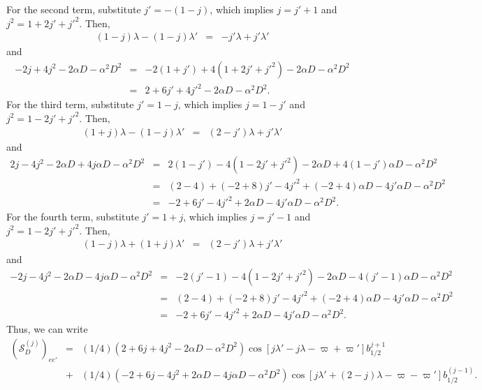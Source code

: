 \documentclass [12pt, a4paper] {article}
\begin{document}
For the second term, substitute $j'= -(1-j)$, which implies 
$j = j' + 1$ and $j^2 = 1 + 2j' + j'^2$. Then,
\begin {eqnarray}
    (1 - j)\lambda - (1- j)\lambda' 
    &=& 
    - j'\lambda + j'\lambda'
\end {eqnarray}
and 
\begin {eqnarray}
    -2j + 4j^2 - 2\alpha D - \alpha^2D^2 
    &=&
    -2(1 + j') + 4(1 + 2j' + j'^2) - 2\alpha D - \alpha^2D^2
    \\
    &=& 
    2 + 6j' + 4j'^2 - 2\alpha D - \alpha^2D^2.
\end {eqnarray}
For the third term, substitute $j'= 1-j$, which implies 
$j = 1 - j'$ and $j^2 = 1 - 2j' + j'^2$. Then,
\begin {eqnarray}
    (1 + j)\lambda - (1- j)\lambda' 
    &=& 
    (2 - j')\lambda + j'\lambda'
\end {eqnarray}
and 
\begin {eqnarray}
    2j - 4j^2 - 2\alpha D + 4j\alpha D - \alpha^2D^2 
    &=&
    2(1 - j') - 4(1 - 2j' + j'^2) - 2\alpha D  + 4(1 - j')\alpha D - \alpha^2D^2
    \\
    &=& 
    (2 - 4) + (-2 + 8)j' -4j'^2  + (-2 + 4)\alpha D - 4j'\alpha D - \alpha^2D^2
    \quad\quad
    \\
    &=&
    -2 + 6j' - 4j'^2 + 2\alpha D - 4j'\alpha D - \alpha^2D^2.
\end {eqnarray}
For the fourth term, substitute $j'= 1+j$, which implies 
$j = j' - 1$ and $j^2 = 1 - 2j' + j'^2$. Then,
\begin {eqnarray}
    (1 - j)\lambda + (1 + j)\lambda' 
    &=& 
    (2 - j')\lambda + j'\lambda'
\end {eqnarray}
and 
\begin {eqnarray}
    -2j - 4j^2 - 2\alpha D - 4j\alpha D - \alpha^2D^2 
    &=&
    -2(j' - 1) - 4(1 - 2j' + j'^2) - 2\alpha D  - 4(j' - 1)\alpha D - \alpha^2D^2
    \\
    &=& 
    (2 - 4) + (-2 + 8)j' -4j'^2  + (-2 + 4)\alpha D - 4j'\alpha D - \alpha^2D^2
    \quad\quad
    \\
    &=&
    -2 + 6j' - 4j'^2 + 2\alpha D - 4j'\alpha D - \alpha^2D^2.
\end {eqnarray}
Thus, we can write 
\begin {eqnarray}
    \left(\mathcal{S}_D^{(j)}\right)_{ee'} 
    &=& 
    (1/4)
    \left(
        2 + 6j + 4j^2 - 2\alpha D - \alpha^2D^2
    \right)
    \cos[j\lambda' - j\lambda - \varpi + \varpi']b_{1/2}^{j + 1}
    \\\nonumber
    &+&
    (1/4)
    \left(
        -2 + 6j - 4j^2 + 2\alpha D - 4j\alpha D - \alpha^2D^2
    \right)
    \cos[j\lambda' + (2-j) \lambda - \varpi - \varpi']b_{1/2}^{(j - 1)}.
\end {eqnarray}
\end{document}
